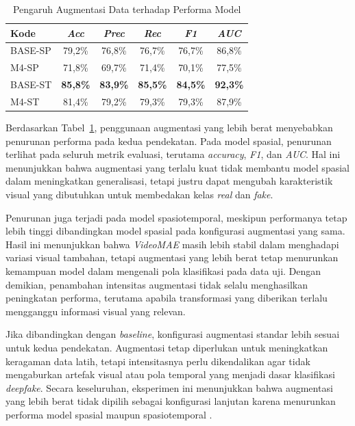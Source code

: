 \begin{table}[htbp]
\centering
\caption{Pengaruh Augmentasi Data terhadap Performa Model}
\label{table:4.ablation-augment}
\begin{tabular}{lccccc}
\toprule
\textbf{Kode} &
\textbf{\textit{Acc}} &
\textbf{\textit{Prec}} &
\textbf{\textit{Rec}} &
\textbf{\textit{F1}} &
\textbf{\textit{AUC}} \\
\midrule
BASE-SP & 79,2\% & 76,8\% & 76,7\% & 76,7\% & 86,8\% \\
M4-SP & 71,8\% & 69,7\% & 71,4\% & 70,1\% & 77,5\% \\
BASE-ST & \textbf{85,8\%} & \textbf{83,9\%} & \textbf{85,5\%} & \textbf{84,5\%} & \textbf{92,3\%} \\
M4-ST & 81,4\% & 79,2\% & 79,3\% & 79,3\% & 87,9\% \\
\bottomrule
\end{tabular}
\end{table}

Berdasarkan Tabel~\ref{table:4.ablation-augment}, penggunaan augmentasi yang lebih berat menyebabkan penurunan performa pada kedua pendekatan. Pada model spasial, penurunan terlihat pada seluruh metrik evaluasi, terutama \textit{accuracy}, \textit{F1}, dan \textit{AUC}. Hal ini menunjukkan bahwa augmentasi yang terlalu kuat tidak membantu model spasial dalam meningkatkan generalisasi, tetapi justru dapat mengubah karakteristik visual yang dibutuhkan untuk membedakan kelas \textit{real} dan \textit{fake}.

Penurunan juga terjadi pada model spasiotemporal, meskipun performanya tetap lebih tinggi dibandingkan model spasial pada konfigurasi augmentasi yang sama. Hasil ini menunjukkan bahwa \textit{VideoMAE} masih lebih stabil dalam menghadapi variasi visual tambahan, tetapi augmentasi yang lebih berat tetap menurunkan kemampuan model dalam mengenali pola klasifikasi pada data uji. Dengan demikian, penambahan intensitas augmentasi tidak selalu menghasilkan peningkatan performa, terutama apabila transformasi yang diberikan terlalu mengganggu informasi visual yang relevan.

Jika dibandingkan dengan \textit{baseline}, konfigurasi augmentasi standar lebih sesuai untuk kedua pendekatan. Augmentasi tetap diperlukan untuk meningkatkan keragaman data latih, tetapi intensitasnya perlu dikendalikan agar tidak mengaburkan artefak visual atau pola temporal yang menjadi dasar klasifikasi \textit{deepfake}. Secara keseluruhan, eksperimen ini menunjukkan bahwa augmentasi yang lebih berat tidak dipilih sebagai konfigurasi lanjutan karena menurunkan performa model spasial maupun spasiotemporal \cite{MUMUNI2022100258,yan2023deepfakebenchcomprehensivebenchmarkdeepfake}.

